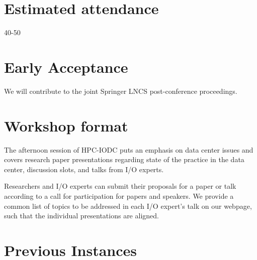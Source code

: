 \documentclass[a4paper,10pt]{article}
\begin{document}
\section{Estimated attendance}
40-50

\section{Early Acceptance}

We will contribute to the joint Springer LNCS post-conference proceedings.


\section{Workshop format}
The afternoon session of HPC-IODC puts an emphasis on data center issues and covers research paper presentations regarding state of the practice in the data center, discussion slots, and talks from I/O experts.

Researchers and I/O experts can submit their proposals for a paper or talk according to a call for participation for papers and speakers.
We provide a common list of topics to be addressed in each I/O expert's talk on our webpage, such that the individual presentations are aligned.



\section{Previous Instances}
\end{document}
